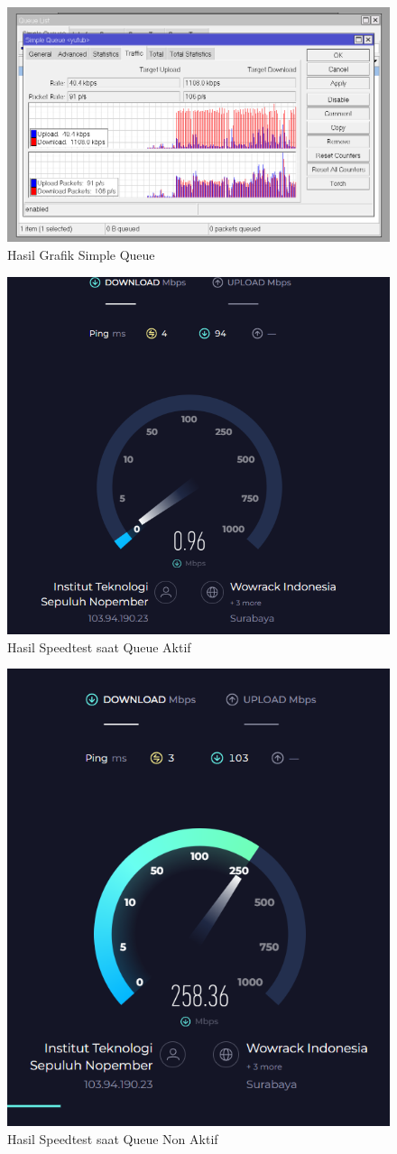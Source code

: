 \begin{figure}[htbp]
  \centering
  \includegraphics[width=0.5\linewidth]{dokum/Laptop 2/Grafik.png}
  \caption{Hasil Grafik Simple Queue}
  \label{fig:queue-grafik}
\end{figure}

\begin{figure}[htbp]
  \centering
  \includegraphics[width=0.5\linewidth]{dokum/speedtest.png}
  \caption{Hasil Speedtest saat Queue Aktif}
  \label{fig:test-aktif}
\end{figure}

\begin{figure}[htbp]
  \centering
  \includegraphics[width=0.5\linewidth]{dokum/speedtestlimit.png}
  \caption{Hasil Speedtest saat Queue Non Aktif}
  \label{fig:test-non-aktif}
\end{figure}

